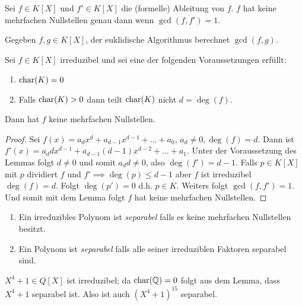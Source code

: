 \begin{lemma}[Übung]
	Sei $f \in K[X]$ und $f' \in K[X]$ die (formelle) Ableitung von $f$.
	$f$ hat keine mehrfachen Nullstellen genau dann wenn $\gcd(f,f') = 1$.
\end{lemma}

\begin{remark}
	Gegeben $f,g \in K[X]$, der euklidische Algorithmus berechnet $\gcd(f,g)$.
\end{remark}

\begin{corollary}
	Sei $f \in K[X]$ irreduzibel und sei eine der folgenden Voraussetzungen erfüllt:
	\begin{enumerate}[(1)]
		\item $\operatorname{char}(K) = 0$
		\item  Falls $\operatorname{char}(K) > 0$ dann teilt $\operatorname{char}(K)$ nicht $d = \deg(f)$.
	\end{enumerate}
	Dann hat $f$ keine mehrfachen Nullstellen.
\end{corollary}

\begin{proof}
	Sei $f(x) = a_{d} x^{d} + a_{d-1} x^{d-1} + \ldots + a_0$, $a_{d} \neq 0, \deg(f) = d$. 
	Dann ist $f'(x) = a_{d} d x^{d-1} + a_{d-1} (d-1) x^{d-2} + \ldots + a_1$.
	Unter der Voraussetzung des Lemmas folgt $d \neq 0$ und somit $a_{d} d \neq 0$, also $\deg(f') = d-1$.
	Falls $p \in K[X]$ mit $p$ dividiert $f$ und $f' \implies \deg(p) \leq d-1$ aber $f$ ist irreduzibel $\deg(f) = d$.
	Folgt $\deg(p') = 0$ d.h.  $p \in K$. Weiters folgt $\gcd(f,f') = 1$.
	Und somit mit dem Lemma folgt $f $ hat keine mehrfachen Nullstellen.
\end{proof}

\begin{definition}
	\begin{enumerate}[(1)]
		\item Ein irreduzibles Polynom ist \emph{separabel} falls es keine mehrfachen Nullstellen besitzt.
		\item Ein Polynom ist \emph{separabel} falls alle seiner irreduziblen Faktoren separabel sind. 
	\end{enumerate}
\end{definition}

\begin{eg}
	$X^{4} + 1 \in Q[X]$ ist irreduzibel; da $\operatorname{char}(\mathbb{Q}) = 0$ folgt aus dem Lemma, dass $X^{4}+ 1$ separabel ist.
	Also ist auch $(X^{4} + 1)^{15}$ separabel.
\end{eg}

